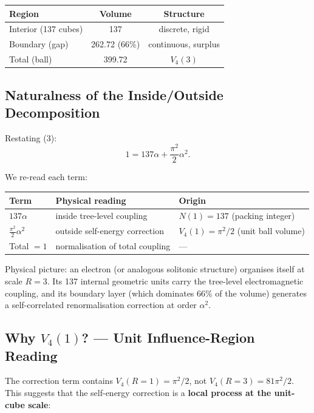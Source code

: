 \documentclass[a4paper,11pt]{article}
\begin{document}
\begin{center}
\begin{tabular}{lcc}
\toprule
Region & Volume & Structure \\
\midrule
Interior (137 cubes) & 137 & discrete, rigid \\
Boundary (gap) & 262.72 (66\%) & continuous, surplus \\
Total (ball) & 399.72 & $V_4(3)$ \\
\bottomrule
\end{tabular}
\end{center}

\subsection{Naturalness of the Inside/Outside Decomposition}

Restating (3):
\[ 1 = 137 \alpha + \frac{\pi^2}{2} \alpha^2. \]

We re-read each term:

\begin{center}
\begin{tabular}{lll}
\toprule
Term & Physical reading & Origin \\
\midrule
$137 \alpha$ & inside tree-level coupling & $N(1) = 137$ (packing integer) \\
$\frac{\pi^2}{2} \alpha^2$ & outside self-energy correction & $V_4(1) = \pi^2/2$ (unit ball volume) \\
Total $= 1$ & normalisation of total coupling & --- \\
\bottomrule
\end{tabular}
\end{center}

Physical picture: an electron (or analogous solitonic structure) organises itself at scale $R=3$. Its 137 internal geometric units carry the tree-level electromagnetic coupling, and its boundary layer (which dominates 66\% of the volume) generates a self-correlated renormalisation correction at order $\alpha^2$.

\subsection{Why $V_4(1)$? --- Unit Influence-Region Reading}

The correction term contains $V_4(R=1) = \pi^2/2$, not $V_4(R=3) = 81\pi^2/2$. This suggests that the self-energy correction is a \textbf{local process at the unit-cube scale}:
\end{document}
